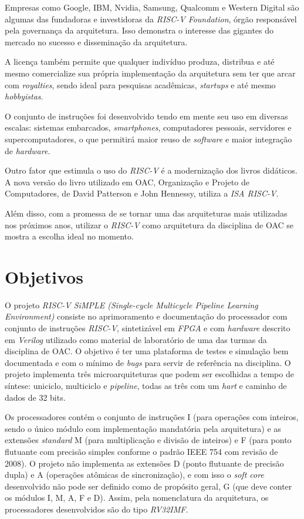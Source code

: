 { Empresas como Google, IBM, Nvidia, Samsung, Qualcomm e Western Digital são
    algumas das fundadoras e investidoras da \textit{RISC-V Foundation}, órgão
    responsável pela governança da arquitetura. Isso demonstra o interesse das
    gigantes do mercado no sucesso e disseminação da arquitetura.
}

{ A licença também permite que qualquer indivíduo produza, distribua e
    até mesmo comercialize sua própria implementação da arquitetura sem ter
    que arcar com \textit{royalties}, sendo ideal para pesquisas acadêmicas,
    \textit{startups} e até mesmo \textit{hobbyistas}.
}

{ O conjunto de instruções foi desenvolvido tendo em mente seu uso em
    diversas escalas: sistemas embarcados, \textit{smartphones},
    computadores pessoais, servidores e supercomputadores, o que permitirá
    maior reuso de \textit{software} e maior integração de
    \textit{hardware}.
}

{ Outro fator que estimula o uso do \textit{RISC-V} é a modernização dos
    livros didáticos. A nova versão do livro utilizado em OAC, Organização
    e Projeto de Computadores, de David Patterson e John Hennessy, utiliza
    a \textit{ISA RISC-V}.
}

{ Além disso, com a promessa de se tornar uma das arquiteturas mais utilizadas
    nos próximos anos, utilizar o \textit{RISC-V} como arquitetura da disciplina
    de OAC se mostra a escolha ideal no momento.
}

\section{Objetivos}
{ O projeto \textit{RISC-V SiMPLE (Single-cycle Multicycle Pipeline Learning
    Environment)} consiste no aprimoramento e documentação do processador com
    conjunto de instruções \textit{RISC-V}, sintetizável em \textit{FPGA} e com
    \textit{hardware} descrito em \textit{Verilog} utilizado como material de
    laboratório de uma das turmas da disciplina de OAC. O objetivo é ter uma
    plataforma de testes e simulação bem documentada e com o mínimo de
    \textit{bugs} para servir de referência na disciplina. O projeto implementa
    três microarquiteturas que podem ser escolhidas a tempo de síntese:
    uniciclo, multiciclo e \textit{pipeline}, todas as três com um \textit{hart}
    e caminho de dados de 32 bits.
}

{ Os processadores contém o conjunto de instruções I (para operações com
    inteiros, sendo o único módulo com implementação mandatória pela
    arquitetura) e as extensões \textit{standard} M (para multiplicação e
    divisão de inteiros) e F (para ponto flutuante com precisão simples conforme
    o padrão IEEE 754 com revisão de 2008). O projeto não implementa as
    extensões D (ponto flutuante de precisão dupla) e A (operações atômicas de
    sincronização), e com isso o \textit{soft core} desenvolvido não pode ser
    definido como de propósito geral, G (que deve conter os módulos I, M, A, F
    e D). Assim, pela nomenclatura da arquitetura, os processadores
    desenvolvidos são do tipo \textit{RV32IMF}.
}

